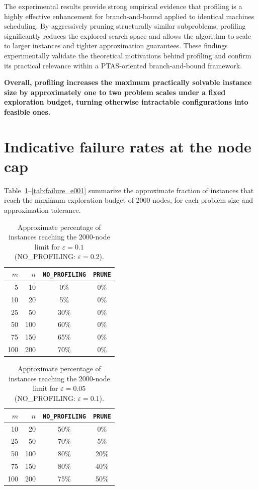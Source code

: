 The experimental results provide strong empirical evidence that profiling is a highly effective enhancement for branch-and-bound applied to identical machines scheduling.
By aggressively pruning structurally similar subproblems, profiling significantly reduces the explored search space and allows the algorithm to scale to larger instances and tighter approximation guarantees.
These findings experimentally validate the theoretical motivations behind profiling and confirm its practical relevance within a PTAS-oriented branch-and-bound framework.

\bigskip
\noindent
\textbf{Overall, profiling increases the maximum practically solvable instance size by approximately one to two problem scales under a fixed exploration budget, turning otherwise intractable configurations into feasible ones.}

\section*{Indicative failure rates at the node cap}

Table~\ref{tab:failure_e01}--\ref{tab:failure_e001} summarize the approximate fraction of instances that reach the maximum exploration budget of 2000 nodes, for each problem size and approximation tolerance.

\begin{table}[H]
\centering
\caption{Approximate percentage of instances reaching the 2000-node limit for $\varepsilon = 0.1$ (NO\_PROFILING: $\varepsilon = 0.2$).}
\label{tab:failure_e01}
\begin{tabular}{r r c c}
\hline
\(m\) & \(n\) & \texttt{NO\_PROFILING} & \texttt{PRUNE} \\
\hline
5   & 10  & 0\% & 0\% \\
10  & 20  & 5\% & 0\% \\
25  & 50  & 30\% & 0\% \\
50  & 100 & 60\% & 0\% \\
75  & 150 & 65\% & 0\% \\
100 & 200 & 70\% & 0\% \\
\hline
\end{tabular}
\end{table}

\begin{table}[H]
\centering
\caption{Approximate percentage of instances reaching the 2000-node limit for $\varepsilon = 0.05$ (NO\_PROFILING: $\varepsilon = 0.1$).}
\label{tab:failure_e005}
\begin{tabular}{r r c c}
\hline
\(m\) & \(n\) & \texttt{NO\_PROFILING} & \texttt{PRUNE} \\
\hline
10  & 20  & 50\% & 0\% \\
25  & 50  & 70\% & 5\% \\
50  & 100 & 80\% & 20\% \\
75  & 150 & 80\% & 40\% \\
100 & 200 & 75\% & 50\% \\
\hline
\end{tabular}
\end{table}

